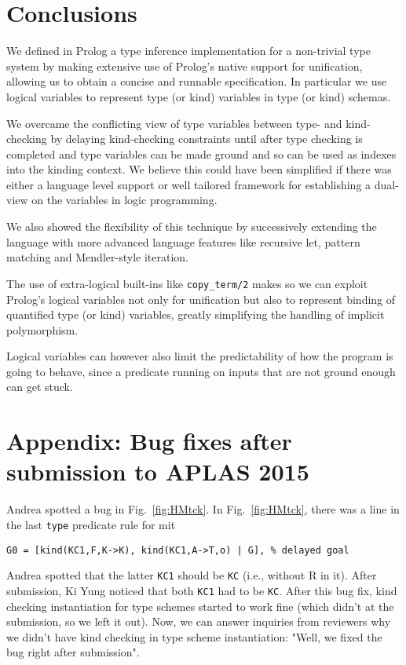 \documentclass[runningheads,a4paper]{llncs}
\begin{document}
\section{Conclusions}\label{sec:concl}

We defined in Prolog a type inference implementation for a non-trivial
type system by making extensive use of Prolog's native support for
unification, allowing us to obtain a concise and runnable
specification. In particular we use logical variables to
represent type (or kind) variables in type (or kind) schemas.

We overcame the conflicting view of type variables between type- and
kind-checking by delaying kind-checking constraints until after
type checking is completed and type variables can be made ground and so
can be used as indexes into the kinding context. We believe this could
have been simplified if there was either a language level support or
well tailored framework for establishing a dual-view on the variables
in logic programming.

We also showed the flexibility of this technique by successively
extending the language with more advanced language features like
recursive let, pattern matching and Mendler-style iteration.

The use of extra-logical built-ins like \verb|copy_term/2| makes so we
can exploit Prolog's logical variables not only for unification but
also to represent binding of quantified type (or kind) variables,
greatly simplifying the handling of implicit polymorphism.

Logical variables can however also limit the predictability of how the
program is going to behave, since a predicate running on inputs that
are not ground enough can get stuck.


\makeatletter
\renewcommand\bibsection{\section*\bibname}
\makeatother



\newpage
\section*{Appendix: Bug fixes after submission to APLAS 2015}
Andrea spotted a bug in Fig.~\ref{fig:HMtck}.
In Fig.~\ref{fig:HMtck}, there was a line
in the last \verb|type| predicate rule for mit
\begin{verbatim}
G0 = [kind(KC1,F,K->K), kind(KC1,A->T,o) | G], % delayed goal
\end{verbatim}
Andrea spotted that the latter \verb|KC1| should be \verb|KC| (i.e., without R in it).
After submission, Ki Yung noticed that both \verb|KC1| had to be \verb|KC|.
After this bug fix, kind checking instantiation for type schemes started
to work fine (which didn't at the submission, so we left it out).
Now, we can answer inquiries from reviewers why we didn't have kind checking
in type scheme instantiation: "Well, we fixed the bug right after submission".
\end{document}

